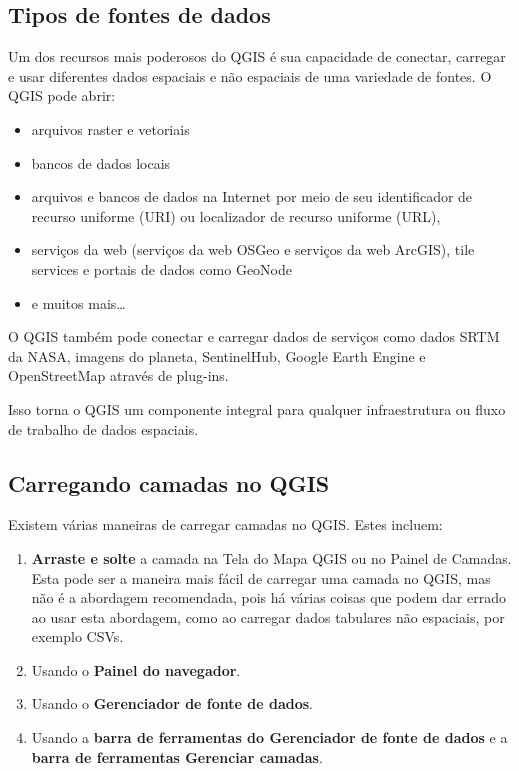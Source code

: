 \documentclass[
]{krantz}
\providecommand{\tightlist}{%
  \setlength{\itemsep}{0pt}\setlength{\parskip}{0pt}}
\begin{document}
\hypertarget{tipos-de-fontes-de-dados}{%
\subsection{Tipos de fontes de dados}\label{tipos-de-fontes-de-dados}}

Um dos recursos mais poderosos do QGIS é sua capacidade de conectar, carregar e usar diferentes dados espaciais e não espaciais de uma variedade de fontes. O QGIS pode abrir:

\begin{itemize}
\tightlist
\item
  arquivos raster e vetoriais
\item
  bancos de dados locais
\item
  arquivos e bancos de dados na Internet por meio de seu identificador de recurso uniforme (URI) ou localizador de recurso uniforme (URL),
\item
  serviços da web (serviços da web OSGeo e serviços da web ArcGIS), tile services e portais de dados como GeoNode
\item
  e muitos mais\ldots{}
\end{itemize}

O QGIS também pode conectar e carregar dados de serviços como dados SRTM da NASA, imagens do planeta, SentinelHub, Google Earth Engine e OpenStreetMap através de plug-ins.

Isso torna o QGIS um componente integral para qualquer infraestrutura ou fluxo de trabalho de dados espaciais.

\hypertarget{carregando-camadas-no-qgis}{%
\subsection{Carregando camadas no QGIS}\label{carregando-camadas-no-qgis}}

Existem várias maneiras de carregar camadas no QGIS. Estes incluem:

\begin{enumerate}
\def\labelenumi{\arabic{enumi}.}
\tightlist
\item
  \textbf{Arraste e solte} a camada na Tela do Mapa QGIS ou no Painel de Camadas. Esta pode ser a maneira mais fácil de carregar uma camada no QGIS, mas não é a abordagem recomendada, pois há várias coisas que podem dar errado ao usar esta abordagem, como ao carregar dados tabulares não espaciais, por exemplo CSVs.
\item
  Usando o \textbf{Painel do navegador}.
\item
  Usando o \textbf{Gerenciador de fonte de dados}.
\item
  Usando a \textbf{barra de ferramentas do Gerenciador de fonte de dados} e a \textbf{barra de ferramentas Gerenciar camadas}.
\end{enumerate}
\end{document}
